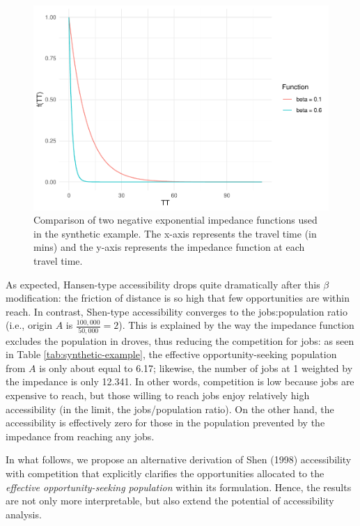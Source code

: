 \documentclass[]{elsarticle} %
\begin{document}
\begin{figure}
\includegraphics[width=1\linewidth]{Spatial-Availability-Refreshed_files/figure-latex/comparison-impedance-functions-synthetic-example-1} \caption{\label{fig:impedance-functions-comparison}Comparison of two negative exponential impedance functions used in the synthetic example. The x-axis represents the travel time (in mins) and the y-axis represents the impedance function at each travel time.}\label{fig:comparison-impedance-functions-synthetic-example}
\end{figure}

As expected, Hansen-type accessibility drops quite dramatically after
this \(\beta\) modification: the friction of distance is so high that
few opportunities are within reach. In contrast, Shen-type accessibility
converges to the jobs:population ratio (i.e., origin \(A\) is
\(\frac{100,000}{50,000} = 2\)). This is explained by the way the
impedance function excludes the population in droves, thus reducing the
competition for jobs: as seen in Table \ref{tab:synthetic-example}, the
effective opportunity-seeking population from \(A\) is only about equal
to 6.17; likewise, the number of jobs at 1 weighted by the impedance is
only 12.341. In other words, competition is low because jobs are
expensive to reach, but those willing to reach jobs enjoy relatively
high accessibility (in the limit, the jobs/population ratio). On the
other hand, the accessibility is effectively zero for those in the
population prevented by the impedance from reaching any jobs.

In what follows, we propose an alternative derivation of Shen (1998)
accessibility with competition that explicitly clarifies the
opportunities allocated to the \emph{effective opportunity-seeking
population} within its formulation. Hence, the results are not only more
interpretable, but also extend the potential of accessibility analysis.
\end{document}

